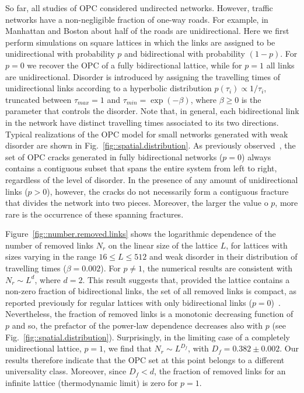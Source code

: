 \documentclass[aps,prl,twocolumn,showpacs,
superscriptaddress,floatfix, 10pt]{revtex4-1}
\begin{document}
So far, all studies of OPC considered undirected networks. However, traffic
networks have a non-negligible fraction of one-way roads. For example, in
Manhattan and Boston about half of the roads are unidirectional. Here we first
perform simulations on square lattices in which the links are assigned to be
unidirectional with probability $p$ and bidirectional with probability $(1-p)$.
For $p=0$ we recover the OPC of a fully bidirectional lattice, while for $p=1$
all links are unidirectional. Disorder is introduced by assigning the travelling
times of unidirectional links according to a hyperbolic distribution
$p\left(\tau_i\right)\propto 1/\tau_i$, truncated between $\tau_{max}=1$ and
$\tau_{min} = \exp \left(-\beta\right)$, where $\beta \geq 0$ is the parameter
that controls the disorder. Note that, in general, each bidirectional link in the
network have distinct travelling times associated to its two directions. Typical
realizations of the OPC model for small networks generated with weak disorder
are shown in Fig.~\ref{fig::spatial.distribution}. As previously
observed~\cite{Andrade2009}, the set of OPC cracks generated in fully
bidirectional networks ($p=0$) always contains a contiguous subset that spans
the entire system from left to right, regardless of the level of disorder. In
the presence of any amount of unidirectional links ($p>0$), however, the cracks
do not necessarily form a contiguous fracture that divides the network into two
pieces. Moreover, the larger the value o $p$, more rare is the occurrence of
these spanning fractures.
	
Figure~\ref{fig::number.removed.links} shows the logarithmic dependence of the
number of removed links $N_r$ on the linear size of the lattice $L$, for
lattices with sizes varying in the range $16\leq L\leq 512$ and weak disorder in
their distribution of travelling times ($\beta=0.002$). For $p\neq 1$, the
numerical results are consistent with $N_r\sim L^d$, where $d=2$.  This result
suggests that, provided the lattice contains a non-zero fraction of
bidirectional links, the set of all removed links is compact, as reported
previously for regular lattices with only bidirectional links
($p=0$)~\cite{Andrade2009}. Nevertheless, the fraction of removed links is a
monotonic decreasing function of $p$ and so, the prefactor of the power-law
dependence decreases also with $p$ (see Fig.~\ref{fig::spatial.distribution}).
Surprisingly, in the limiting case of a completely unidirectional lattice,
$p=1$, we find that $N_r\sim L^{D_f}$, with $D_f=0.382\pm 0.002$. Our results
therefore indicate that the OPC set at this point belongs to a different
universality class. Moreover, since $D_f<d$, the fraction of removed links for
an infinite lattice (thermodynamic limit) is zero for $p=1$.
	
\end{document}
